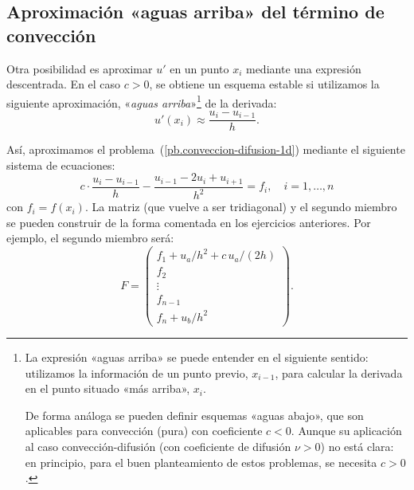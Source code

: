\documentclass[11pt,spanish,a4wide]{article}
\begin{document}
\subsection{Aproximación «aguas arriba» del término de convección}
Otra posibilidad es aproximar $u'$ en un punto $x_i$ mediante una
expresión descentrada. En el caso $c>0$, se obtiene un esquema estable
si utilizamos la siguiente aproximación, «\textit{aguas
  arriba}»\footnote{La expresión «aguas arriba» se puede entender en
  el siguiente sentido: utilizamos la información de un punto previo,
  $x_{i-1}$, para calcular la derivada en el punto situado «más
  arriba», $x_i$. \par De forma análoga se pueden definir esquemas «aguas
  abajo», que son aplicables para convección (pura) con coeficiente
  $c<0$. Aunque su aplicación al caso convección-difusión (con
  coeficiente de difusión $\nu>0$) no está
  clara: en principio, para el buen planteamiento de estos problemas,
  se necesita $c>0$. }  de la derivada:
$$ u'(x_i) \approx \frac{u_{i}-u_{i-1}}{h}.
$$

Así, aproximamos el problema~(\ref{pb.conveccion-difusion-1d})
mediante el siguiente sistema de ecuaciones:
$$
c\cdot \frac{u_{i}-u_{i-1}}{h} -\frac{u_{i-1}-2u_i + u_{i+1}}{h^2}
= f_i, \quad i=1,\dots,n
$$
con $f_i=f(x_i)$. La matriz (que vuelve a ser tridiagonal) y el
segundo miembro se pueden construir de la forma comentada en los
ejercicios anteriores.
  Por ejemplo, el segundo miembro será:
  $$
  F=
  \begin{pmatrix}
    f_1 + u_a/h^2 + c\, u_a/(2h)
    \\ f_2 \\ \vdots \\ f_{n-1} \\[1mm]
    f_n+u_b/h^2
  \end{pmatrix}.
  $$
\end{document}
